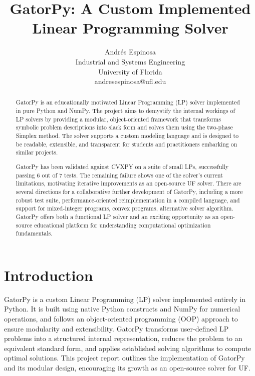 \documentclass[conference]{IEEEtran}
\begin{document}
\title{GatorPy: A Custom Implemented Linear Programming Solver}

\author{
    \begin{minipage}{0.50\textwidth}
        \centering
        \textcolor{uf_blue}{Andrés Espinosa} \\
        \textcolor{uf_orange}{Industrial and Systems Engineering} \\
        \textcolor{uf_orange}{University of Florida} \\
        \textcolor{uf_orange}{andresespinosa@ufl.edu} \\ 
    \end{minipage}
}


\maketitle


\begin{abstract}
GatorPy is an educationally motivated Linear Programming (LP) solver implemented in pure Python and NumPy. 
The project aims to demystify the internal workings of LP solvers by providing a modular, object-oriented framework that transforms symbolic problem descriptions into slack form and solves them using the two-phase Simplex method. 
The solver supports a custom modeling language and is designed to be readable, extensible, and transparent for students and practitioners embarking on similar projects. 

GatorPy has been validated against CVXPY on a suite of small LPs, successfully passing 6 out of 7 tests. 
The remaining failure shows one of the solver's current limitations, motivating iterative improvements as an open-source UF solver. 
There are several directions for a collaborative further development of GatorPy, including a more robust test suite, performance-oriented reimplementation in a compiled language, and support for mixed-integer programs, convex programs, alternative solver algorithm. 
GatorPy offers both a functional LP solver and an exciting opportunity as an open-source educational platform for understanding computational optimization fundamentals.    
\end{abstract}

\IEEEpeerreviewmaketitle

\section{Introduction}
\label{sse:introduction}
GatorPy is a custom Linear Programming (LP) solver implemented entirely in Python. 
It is built using native Python constructs and NumPy for numerical operations, and follows an object-oriented programming (OOP) approach to ensure modularity and extensibility. 
GatorPy transforms user-defined LP problems into a structured internal representation, reduces the problem to an equivalent standard form, and applies established solving algorithms to compute optimal solutions.
This project report outlines the implementation of GatorPy and its modular design, encouraging its growth as an open-source solver for UF. 
\end{document}
